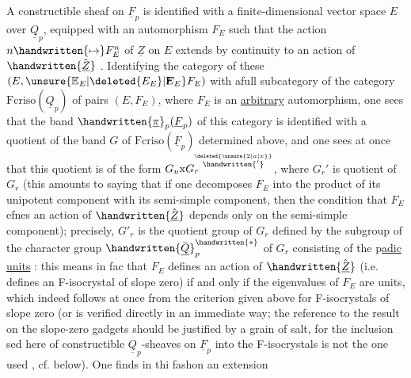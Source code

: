 A constructible sheaf on $\underline{F}_p$ is identified with a finite-dimensional vector space $E$ over $\underline{Q}_p$, equipped with an automorphism $F_E$ such that the  action $n\handwritten{\mapsto}F_E^n$ of $\underline{Z}$ on $E$ extends by continuity to an action of  $\handwritten{\hat{\underline{Z}}}$ . Identifying  the category of these $(E,\unsure{\mathbb{E}_E|\deleted{E_E}|\rlap{F}E_E}F_E)$ with afull subcategory of the category  $\mathrm{Fcriso}(\underline{Q}_p)$ of pairs $(E,F_E)$, where $F_E$ is an \uline{arbitrary} automorphism, one sees that the band  $\handwritten{\underline{\pi}}_p(\underline{F}_p)$ of this category is identified with a quotient of the band $G$ of $\mathrm{Fcriso}(\underline{F}_p)$ determined above, and one sees at once that this quotient is of the form $G_u\mathrm{x}G_r^{\overset{\deleted{\unsure{2|a|x}}}{\handwritten{'}}}$, where $G_r'$ is  quotient of $G_r$ (this amounts to saying that if one decomposes $F_E$ into the product of its unipotent component with its semi-simple component, then the condition that $F_E$ efnes an action of $\handwritten{\hat{\underline{Z}}}$ depends only on the semi-simple component); precisely, $G'_r$ is the quotient group of $G_r$ defined by the subgroup of the character group $\handwritten{\bar{\underline{Q}}}_p^{\handwritten{*}}$ of $G_r$ consisting of the p\uline{adic} \uline{units} : this means in fac that $F_E$ defines an action of  $\handwritten{\hat{\underline{Z}}}$ (i.e. defines an F-isocrystal of slope zero) if and only if the eigenvalues of $F_E$ are units, which indeed follows at once from the criterion given above for F-isocrystals of slope zero (or is verified directly in an immediate way; the reference to the result on the slope-zero gadgets should be justified by a grain of salt, for the inclusion sed here of constructible $\underline{Q}_p$-sheaves on $\underline{F}_p$ into the F-isocrystals is not the one used , cf. below). One finds in thi fashon an extension 